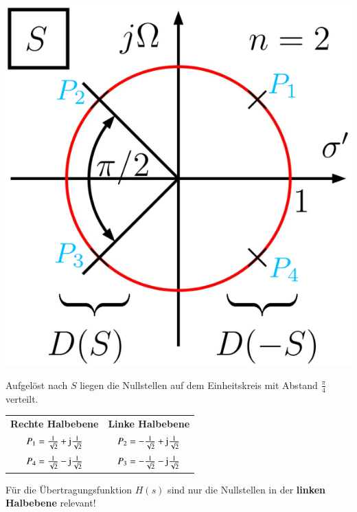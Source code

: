 \begin{minipage}[c]{0.3\columnwidth}
    \includegraphics[width=\columnwidth]{images/filter_butterworth_pollagen_ordnung_2.png}
\end{minipage}
\hfill
\begin{minipage}[c]{0.58\columnwidth}
    Aufgelöst nach $S$ liegen die Nullstellen auf dem Einheitskreis mit Abstand $\frac{\pi}{4}$ verteilt.
    \vspace{0.2cm}

    \renewcommand{\arraystretch}{1.3}
    \begin{tabular}{c c}
        \textbf{Rechte Halbebene}                             & \textbf{Linke Halbebene} \\
        $P_1 = \frac{1}{\sqrt{2}} + \mathrm{j} \frac{1}{\sqrt{2}}$ & $P_2 = - \frac{1}{\sqrt{2}} + \mathrm{j} \frac{1}{\sqrt{2}}$ \\
        $P_4 = \frac{1}{\sqrt{2}} - \mathrm{j} \frac{1}{\sqrt{2}}$ & $P_3 = - \frac{1}{\sqrt{2}} - \mathrm{j} \frac{1}{\sqrt{2}}$ \\
    \end{tabular}
    \renewcommand{\arraystretch}{1}

    \vspace{0.2cm}
    \textrightarrow Für die Übertragungsfunktion $H(s)$ sind nur die Nullstellen in der \textbf{linken Halbebene} relevant!
\end{minipage}

